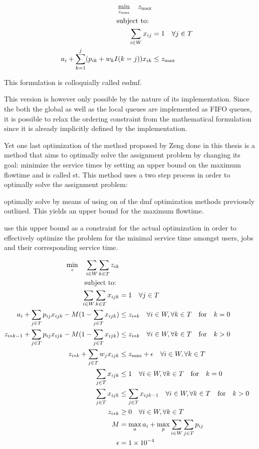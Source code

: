 \documentclass{seal_thesis}
\begin{document}
\begin{align}
    \min_{z_{\text{max}}} \quad z_{\text{max}}\\
    \text{subject to: } \notag \\
    \sum_{i \in W} x_{ij} &= 1 \quad \forall j \in T\\
    a_i + \sum_{k=1}^j (p_{ik} + w_k I(k=j))x_{ik} &\leq z_{\text{max}}
\end{align}

This formulation is colloquially called \gls{esdmf}.

This version is however only possible by the nature of its implementation. Since the both the global as well as the local queues are implemented as FIFO queues, it is possible to relax the ordering constraint from the mathematical formulation since it is already implicitly defined by the implementation.

Yet one last optimization of the method proposed by Zeng done in this thesis is a method that aims to optimally solve the assignment problem by changing its goal: minimize the service times by setting an upper bound on the maximum flowtime and is called \gls{st}. This method uses a two step process in order to optimally solve the assignment problem:
\begin{enumerate*}
	\item optimally solve by means of using on of the \gls{dmf} optimization methods previously outlined. This yields an upper bound for the maximum flowtime.
	\item use this upper bound as a constraint for the actual optimization in order to effectively optimize the problem for the minimal service time amongst users, jobs and their corresponding service time.
\end{enumerate*}

\begin{align}
    \min_z \quad \sum_{i \in W} \sum_{k \in T} z_{ik}\\
    \text{subject to: } \notag \\
    \sum_{i \in W} \sum_{k \in T} x_{ijk} &= 1 \quad \forall j \in T\\
    a_i + \sum_{j \in T} p_{ij} x_{ijk} - M(1 - \sum_{j \in T} x_{ijk}) &\leq z_{i*k} \quad \forall i \in W, \forall k \in T \quad \text{for} \quad k=0\\
    z_{i*k-1} + \sum_{j \in T} p_{ij} x_{ijk} - M(1 - \sum_{j \in T} x_{ijk}) &\leq z_{i*k} \quad \forall i \in W, \forall k \in T \quad \text{for} \quad k>0\\
    z_{i*k}+ \sum_{j \in T} w_j x_{ijk} &\leq z_{\text{max}} + \epsilon \quad \forall i \in W, \forall k \in T\\
    \sum_{j \in T} x_{ijk} &\leq 1 \quad \forall i \in W, \forall k \in T \quad \text{for} \quad k=0\\
    \sum_{j \in T} x_{ijk} &\leq \sum_{j \in T} x_{ijk-1} \quad \forall i \in W, \forall k \in T \quad \text{for} \quad k>0\\
    z_{i*k} &\geq 0 \quad \forall i \in W, \forall k \in T\\
    M &= \max_a a_i + \max_p \sum_{i \in W} \sum_{j \in T} p_{ij}\\
    \epsilon &= \num{1e-4}
\end{align}
\end{document}
